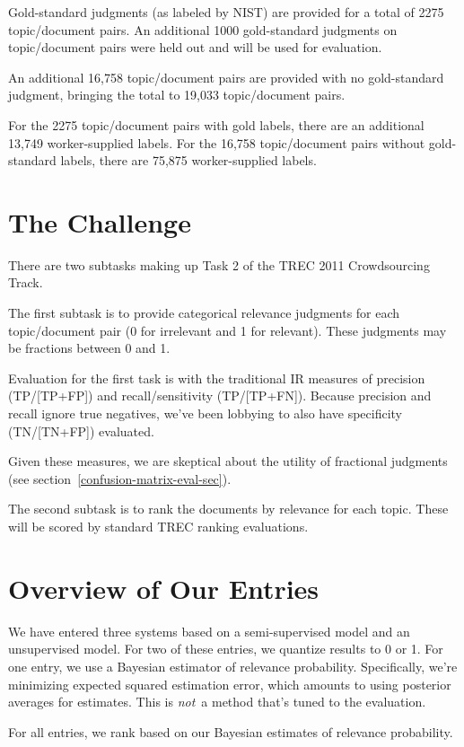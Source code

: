 \documentclass{article}
\begin{document}
Gold-standard judgments (as labeled by NIST) are provided for a total of
2275 topic/document pairs.  An additional 1000 gold-standard judgments
on topic/document pairs were held out and will be used for evaluation.

An additional 16,758 topic/document pairs
are provided with no gold-standard judgment, bringing the total to
19,033 topic/document pairs. 

For the 2275 topic/document pairs with gold labels, there are an
additional 13,749 worker-supplied labels.  For the 16,758
topic/document pairs without gold-standard labels, there are
75,875 worker-supplied labels.


\section{The Challenge}

There are two subtasks making up Task 2 of the TREC 2011 Crowdsourcing
Track.  

The first subtask is to provide categorical relevance judgments for
each topic/document pair (0 for irrelevant and 1 for relevant).
These judgments may be fractions between 0 and 1.

Evaluation for the first task is with the traditional IR measures of
precision (TP/[TP+FP]) and recall/sensitivity (TP/[TP+FN]).  Because
precision and recall ignore true negatives, we've been lobbying to
also have specificity (TN/[TN+FP]) evaluated.  

Given these measures, we are skeptical about the utility of fractional
judgments (see section~\ref{confusion-matrix-eval-sec}).  

The second subtask is to rank the documents by relevance for each
topic.  These will be scored by standard TREC ranking evaluations.


\section{Overview of Our Entries}

We have entered three systems based on a semi-supervised model and an
unsupervised model.  For two of these entries, we quantize results to
0 or 1.  For one entry, we use a Bayesian estimator of relevance
probability.  Specifically, we're minimizing expected squared
estimation error, which amounts to using posterior averages for
estimates.  This is {\it not}\ a method that's tuned to the
evaluation.

For all entries, we rank based on our Bayesian estimates of
relevance probability.  
\end{document}
